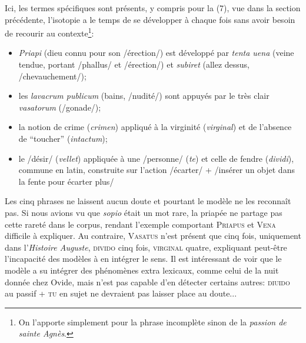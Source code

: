 Ici, les termes spécifiques sont présents, y compris pour la (7), vue dans la section précédente, l'isotopie a le temps de se développer à chaque fois sans avoir besoin de recourir au contexte\footnote{On l'apporte simplement pour la phrase incomplète sinon de la \textit{passion de sainte Agnès}.}:
\begin{itemize}
    \item \textit{Priapi} (dieu connu pour son /érection/) est développé par \textit{tenta uena} (veine tendue, portant /phallus/ et /érection/) et \textit{subiret} (allez dessus, /chevauchement/);
    \item les \textit{lavacrum publicum} (bains, /nudité/) sont appuyés par le très clair \textit{vasatorum} (/gonade/);
    \item la notion de crime (\textit{crimen}) appliqué à la virginité (\textit{virginal}) et de l'absence de ``toucher'' (\textit{intactum});
    \item le /désir/ (\textit{vellet}) appliquée à une /personne/ (\textit{te}) et celle de fendre (\textit{dividi}), commune en latin, construite sur l'action /écarter/ + /insérer un objet dans la fente pour écarter plus/
\end{itemize}

Les cinq phrases ne laissent aucun doute et pourtant le modèle ne les reconnaît pas. Si nous avions vu que \textit{sopio} était un mot rare, la priapée ne partage pas cette rareté dans le corpus, rendant l'exemple comportant \textsc{Priapus} et \textsc{Vena} difficile à expliquer. Au contraire, \textsc{Vasatus} n'est présent que cinq fois, uniquement dans l'\textit{Histoire Auguste}, \textsc{divido} cinq fois, \textsc{virginal} quatre, expliquant peut-être l'incapacité des modèles à en intégrer le sens. Il est intéressant de voir que le modèle a su intégrer des phénomènes extra lexicaux, comme celui de la nuit donnée chez Ovide, mais n'est pas capable d'en détecter certains autres: \textsc{diuido} au passif + \textsc{tu} en sujet ne devraient pas laisser place au doute... 

